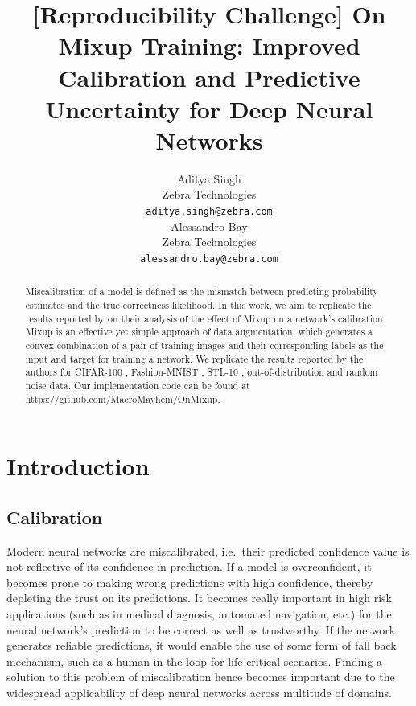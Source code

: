\documentclass{article}
\title{[Reproducibility Challenge] On Mixup Training: Improved Calibration and
Predictive Uncertainty for Deep Neural Networks}
\author{%
  Aditya Singh \\
  Zebra Technologies \\
  \texttt{aditya.singh@zebra.com} \\
  \And
  Alessandro Bay \\
  Zebra Technologies \\
  \texttt{alessandro.bay@zebra.com} \\
}
\begin{document}
\maketitle

\begin{abstract}
  Miscalibration of a model is defined as the mismatch between predicting probability estimates and the true correctness likelihood. In this work, we aim to replicate the results reported by \cite{onmixup} on their analysis of the effect of Mixup \cite{mixup_2018} on a network's calibration. Mixup is an effective yet simple approach of data augmentation, which generates a convex combination of a pair of training images and their corresponding labels as the input and target for training a network. We replicate the results reported by the authors for CIFAR-100 \cite{cifar100}, Fashion-MNIST \cite{fmnist}, STL-10 \cite{stl10}, out-of-distribution and random noise data. Our implementation code can be found at \url{https://github.com/MacroMayhem/OnMixup}.
\end{abstract}


\section{Introduction}
\subsection{Calibration}
Modern neural networks are miscalibrated, i.e.\ their predicted confidence value is not reflective of its confidence in prediction. If a model is overconfident, it becomes prone to making wrong predictions with high confidence, thereby depleting the trust on its predictions. It becomes really important in high risk applications (such as in medical diagnosis, automated navigation, etc.) for the neural network's prediction to be correct as well as trustworthy. If the network generates reliable predictions, it would enable the use of some form of fall back mechanism, such as a human-in-the-loop for life critical scenarios. Finding a solution to this problem of miscalibration hence becomes important due to the widespread applicability of deep neural networks %
across multitude of domains.
\end{document}
